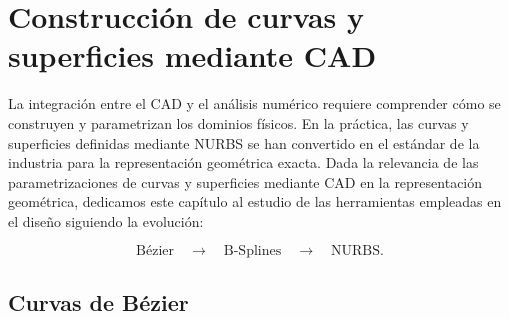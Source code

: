 \documentclass[11pt]{book}
\newcommand{\clearemptydoublepage}{\newpage{\pagestyle{empty}\cleardoublepage}}
\theoremstyle{plain} %
\theoremstyle{definition} %
\theoremstyle{definition} %
\begin{document}
\clearemptydoublepage

\chapter{Construcción de curvas y superficies mediante CAD}\label{chap2}



\vspace{-0.75cm}


La integración entre el CAD y el análisis numérico requiere comprender cómo se construyen y parametrizan los dominios físicos.
En la práctica, las curvas y superficies definidas mediante NURBS se han convertido en el estándar de la industria
para la representación geométrica exacta. Dada la relevancia de las parametrizaciones de curvas y superficies mediante CAD en la representación geométrica, dedicamos este capítulo al estudio de las herramientas empleadas en el diseño siguiendo la evolución:

\begin{equation*}
    \text{Bézier} \quad \longrightarrow \quad \text{B-Splines} \quad \longrightarrow \quad \text{NURBS}.
\end{equation*}

\vspace{-0.65cm}

\section{Curvas de Bézier}
\end{document}
